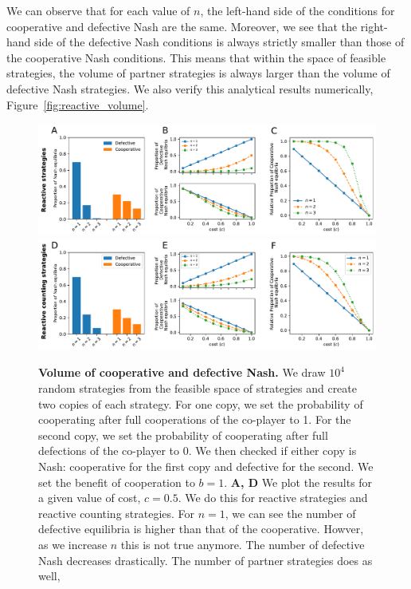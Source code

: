 \documentclass[11pt]{article}
\theoremstyle{plainCl1}
\theoremstyle{plainCl2}
\begin{document}
\noindent
We can observe that for each value of \(n\), the left-hand side of the
conditions for cooperative and defective Nash are the same. Moreover, we see
that the right-hand side of the defective Nash conditions is always
strictly smaller than those of the cooperative Nash conditions. This means that
within the space of feasible strategies, the volume of partner strategies is
always larger than the volume of defective Nash strategies. We also verify this
analytical results numerically, Figure~\ref{fig:reactive_volume}.

\begin{figure}[t]
  \centering
  \includegraphics[width=\textwidth]{../../figures/siFig1.pdf}
  \includegraphics[width=\textwidth]{../../figures/siFig1Counting.pdf}
  \caption{
  \textbf{Volume of cooperative and defective Nash.}
We draw \(10^4\) random
strategies from the feasible space of strategies and create two copies of each
strategy. For one copy, we set the probability of cooperating after full
cooperations of the co-player to 1. For the second copy, we set the probability
of cooperating after full defections of the co-player to 0. We then checked if
either copy is Nash: cooperative for the first copy and defective for the second.
We set the benefit of cooperation to \(b = 1\).
{\bf A, D} We plot the results for a given value of cost, \(c = 0.5\). We do this
for reactive strategies and reactive counting strategies. For $n=1$, we can see
the number of defective equilibria is higher than that of the cooperative.
Howver, as we increase $n$ this is not true anymore. The number of defective
Nash decreases drastically. The number of partner strategies does as well,
}
\end{figure}
\end{document}
